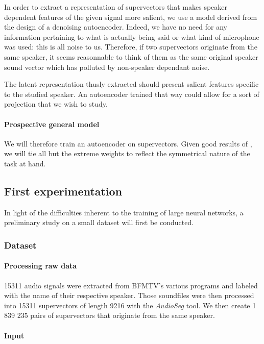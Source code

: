 \documentclass[conference]{IEEEtran}
\begin{document}
In order to extract a representation of supervectors that makes speaker
dependent features of the given signal more salient, we use a model derived from
the design of a denoising autoencoder. Indeed, we have no need for any
information pertaining to what is actually being said or what kind of microphone
was used: this is all noise to us. Therefore, if two supervectors originate from
the same speaker, it seems reasonnable to think of them as the same original \og
speaker\fg{} sound vector which has polluted by non-speaker dependant noise.

The latent representation thusly extracted should present salient features
specific to the studied speaker. An autoencoder trained that way could allow for
a sort of projection that we wish to study.

\paragraph{Prospective general model}

We will therefore train an autoencoder on supervectors. Given good results of
\cite{vukotic:hal-01314302}, we will tie all but the extreme weights to reflect the
symmetrical nature of the task at hand.

\subsection{First experimentation}

In light of the difficulties inherent to the training of large neural networks,
a preliminary study on a small dataset will first be conducted.

\subsubsection{Dataset}

\paragraph{Processing raw data}

15311 audio signals were extracted from BFMTV's various programs and labeled
with the name of their respective speaker. Those soundfiles were then processed
into 15311 supervectors of length 9216 with the \emph{AudioSeg} tool.
We then create 1 839 235 pairs of supervectors that originate from the same
speaker.

\paragraph{Input}
\end{document}
